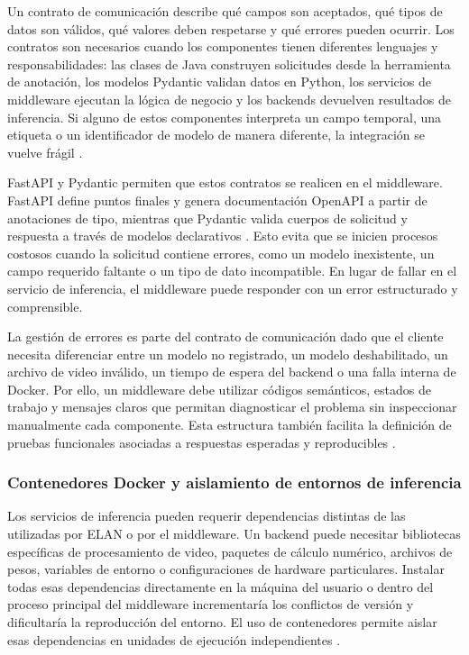 \documentclass[11pt,a4paper]{article}
\begin{document}
Un contrato de comunicación describe qué campos son aceptados, qué tipos de datos son válidos, qué valores deben respetarse y qué errores pueden ocurrir. Los contratos son necesarios cuando los componentes tienen diferentes lenguajes y responsabilidades: las clases de Java construyen solicitudes desde la herramienta de anotación, los modelos Pydantic validan datos en Python, los servicios de middleware ejecutan la lógica de negocio y los backends devuelven resultados de inferencia. Si alguno de estos componentes interpreta un campo temporal, una etiqueta o un identificador de modelo de manera diferente, la integración se vuelve frágil \cite{fielding2000rest}.

FastAPI y Pydantic permiten que estos contratos se realicen en el middleware. FastAPI define puntos finales y genera documentación OpenAPI a partir de anotaciones de tipo, mientras que Pydantic valida cuerpos de solicitud y respuesta a través de modelos declarativos \cite{fastapi2026features,pydantic2026models}. Esto evita que se inicien procesos costosos cuando la solicitud contiene errores, como un modelo inexistente, un campo requerido faltante o un tipo de dato incompatible. En lugar de fallar en el servicio de inferencia, el middleware puede responder con un error estructurado y comprensible.

La gestión de errores es parte del contrato de comunicación dado que el cliente necesita diferenciar entre un modelo no registrado, un modelo deshabilitado, un archivo de video inválido, un tiempo de espera del backend o una falla interna de Docker. Por ello, un middleware debe utilizar códigos semánticos, estados de trabajo y mensajes claros que permitan diagnosticar el problema sin inspeccionar manualmente cada componente. Esta estructura también facilita la definición de pruebas funcionales asociadas a respuestas esperadas y reproducibles \cite{fastapi2026features,pydantic2026models}.

\subsubsection{Contenedores Docker y aislamiento de entornos de inferencia}

Los servicios de inferencia pueden requerir dependencias distintas de las utilizadas por ELAN o por el middleware. Un backend puede necesitar bibliotecas específicas de procesamiento de video, paquetes de cálculo numérico, archivos de pesos, variables de entorno o configuraciones de hardware particulares. Instalar todas esas dependencias directamente en la máquina del usuario o dentro del proceso principal del middleware incrementaría los conflictos de versión y dificultaría la reproducción del entorno. El uso de contenedores permite aislar esas dependencias en unidades de ejecución independientes \cite{docker2026overview}.
\end{document}
